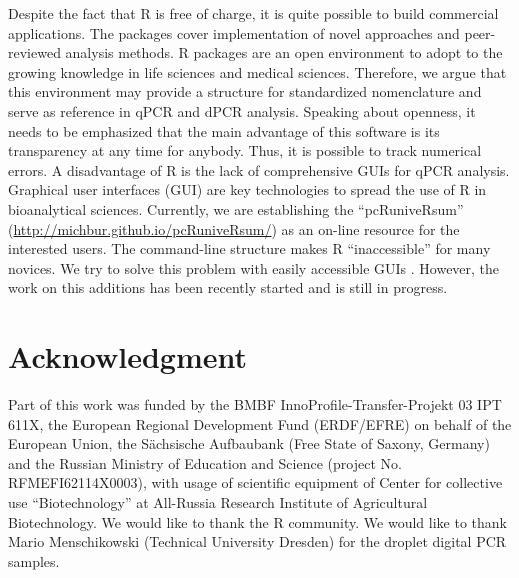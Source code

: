 Despite the fact 
that R is free of charge, it is quite possible to build commercial applications. 
The packages cover implementation of novel approaches and peer-reviewed analysis 
methods. R packages are an open environment to adopt to the growing knowledge in 
life sciences and medical sciences. Therefore, we argue that this environment may provide a 
structure for standardized nomenclature and serve as reference in qPCR and dPCR 
analysis. Speaking about openness, it needs to be emphasized that the main 
advantage of this software is its transparency at any time for anybody. Thus, it 
is possible to track numerical errors.  A disadvantage of R is the lack of 
comprehensive GUIs for qPCR analysis. Graphical user interfaces 
(GUI) are key technologies to spread the use of R in bioanalytical sciences. 
Currently, we are establishing the ``pcRuniveRsum'' 
(\url{http://michbur.github.io/pcRuniveRsum/}) as an on-line resource for the 
interested users. The command-line structure makes R ``inaccessible'' for many 
novices. We try to solve this problem with easily accessible GUIs 
\citep{rodiger_rkward_2012}. However, the work on this additions has been 
recently started and is still in progress.

\section{Acknowledgment}

Part of this work was funded by the BMBF InnoProfile-Transfer-Projekt 03 IPT 
611X, the European Regional Development Fund (ERDF/EFRE) on behalf of the 
European Union, the S\"{a}chsische Aufbaubank (Free State of Saxony, 
Germany) and the Russian Ministry of Education and Science (project No. 
RFMEFI62114X0003), with usage of scientific equipment of Center for 
collective use ``Biotechnology'' at All-Russia Research Institute of 
Agricultural Biotechnology. We would like to thank the R community. We would 
like to thank Mario Menschikowski (Technical University Dresden) for the droplet 
digital PCR samples. 



\address{Stefan R\"odiger (corresponding author)\\
  Faculty of Natural Sciences\\
  Brandenburg University of Technology Cottbus--Senftenberg\\
  Senftenberg\\
  Germany}

